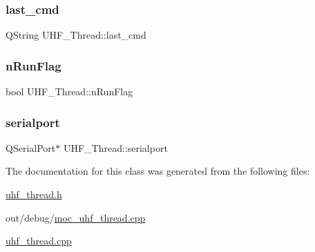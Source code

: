 \mbox{\label{class_u_h_f___thread_a04164c9431f66a3e25ea1206ac1b1adc}} 
\subsubsection{\texorpdfstring{last\_cmd}{last\_cmd}}
{\footnotesize\ttfamily Q\+String U\+H\+F\+\_\+\+Thread\+::last\+\_\+cmd}

\mbox{\label{class_u_h_f___thread_ab40811b93c5e8b31c4f40cc79139e504}} 
\subsubsection{\texorpdfstring{nRunFlag}{nRunFlag}}
{\footnotesize\ttfamily bool U\+H\+F\+\_\+\+Thread\+::n\+Run\+Flag}

\mbox{\label{class_u_h_f___thread_a20904e9764b311fdb015c3fd6cbec497}} 
\subsubsection{\texorpdfstring{serialport}{serialport}}
{\footnotesize\ttfamily Q\+Serial\+Port$\ast$ U\+H\+F\+\_\+\+Thread\+::serialport\hspace{0.3cm}{\ttfamily [private]}}



The documentation for this class was generated from the following files\+:\begin{DoxyCompactItemize}
\item 
\mbox{\hyperlink{uhf__thread_8h}{uhf\+\_\+thread.\+h}}\item 
out/debug/\mbox{\hyperlink{moc__uhf__thread_8cpp}{moc\+\_\+uhf\+\_\+thread.\+cpp}}\item 
\mbox{\hyperlink{uhf__thread_8cpp}{uhf\+\_\+thread.\+cpp}}\end{DoxyCompactItemize}

